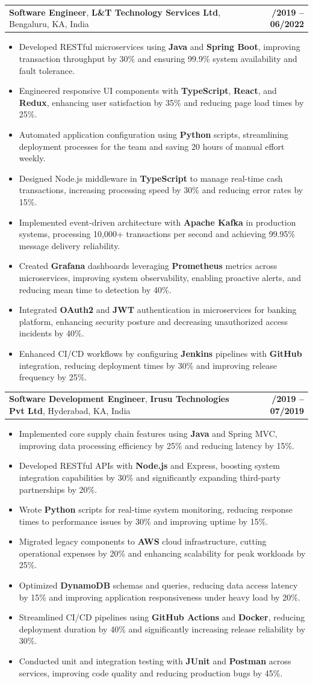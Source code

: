 \documentclass[letterpaper,11pt]{article}
\makeatletter
\newcommand{\resumeItem}[1]{
  \item\footnotesize{
    {#1 \vspace{-2pt}}
  }
}
\newcommand{\resumeSubheading}[4]{
  \vspace{-2pt}\item
    \begin{tabular*}{1.0\textwidth}[t]{l@{\extracolsep{\fill}}r}
      \textbf{\fontsize{10pt}{14pt}\selectfont #3}, \textbf{\fontsize{10pt}{14pt}\selectfont #1}, \fontsize{10pt}{14pt}\selectfont #4 & \textbf{\fontsize{10pt}{14pt}\selectfont #2} \\
    \end{tabular*}\vspace{-7pt}
}
\newcommand{\resumeItemListStart}{\begin{itemize}[leftmargin=*]}
\newcommand{\resumeItemListEnd}{\end{itemize}\vspace{-5pt}}
\makeatother
\begin{document}
    \resumeSubheading
        {L\&T Technology Services Ltd}{08/2019 -- 06/2022}
        {Software Engineer}{Bengaluru, KA, India}
      \resumeItemListStart
        \resumeItem{Developed RESTful microservices using \textbf{Java} and \textbf{Spring Boot}, improving transaction throughput by 30\% and ensuring 99.9\% system availability and fault tolerance.}
        \resumeItem{Engineered responsive UI components with \textbf{TypeScript}, \textbf{React}, and \textbf{Redux}, enhancing user satisfaction by 35\% and reducing page load times by 25\%.}
        \resumeItem{Automated application configuration using \textbf{Python} scripts, streamlining deployment processes for the team and saving 20 hours of manual effort weekly.}
        \resumeItem{Designed Node.js middleware in \textbf{TypeScript} to manage real-time cash transactions, increasing processing speed by 30\% and reducing error rates by 15\%.}
        \resumeItem{Implemented event-driven architecture with \textbf{Apache Kafka} in production systems, processing 10,000+ transactions per second and achieving 99.95\% message delivery reliability.}
        \resumeItem{Created \textbf{Grafana} dashboards leveraging \textbf{Prometheus} metrics across microservices, improving system observability, enabling proactive alerts, and reducing mean time to detection by 40\%.}
        \resumeItem{Integrated \textbf{OAuth2} and \textbf{JWT} authentication in microservices for banking platform, enhancing security posture and decreasing unauthorized access incidents by 40\%.}
        \resumeItem{Enhanced CI/CD workflows by configuring \textbf{Jenkins} pipelines with \textbf{GitHub} integration, reducing deployment times by 30\% and improving release frequency by 25\%.}
      \resumeItemListEnd

    \resumeSubheading
        {Irusu Technologies Pvt Ltd}{01/2019 -- 07/2019}
        {Software Development Engineer}{Hyderabad, KA, India}
      \resumeItemListStart
        \resumeItem{Implemented core supply chain features using \textbf{Java} and Spring MVC, improving data processing efficiency by 25\% and reducing latency by 15\%.}
        \resumeItem{Developed RESTful APIs with \textbf{Node.js} and Express, boosting system integration capabilities by 30\% and significantly expanding third-party partnerships by 20\%.}
        \resumeItem{Wrote \textbf{Python} scripts for real-time system monitoring, reducing response times to performance issues by 30\% and improving uptime by 15\%.}
        \resumeItem{Migrated legacy components to \textbf{AWS} cloud infrastructure, cutting operational expenses by 20\% and enhancing scalability for peak workloads by 25\%.}
        \resumeItem{Optimized \textbf{DynamoDB} schemas and queries, reducing data access latency by 15\% and improving application responsiveness under heavy load by 20\%.}
        \resumeItem{Streamlined CI/CD pipelines using \textbf{GitHub Actions} and \textbf{Docker}, reducing deployment duration by 40\% and significantly increasing release reliability by 30\%.}
        \resumeItem{Conducted unit and integration testing with \textbf{JUnit} and \textbf{Postman} across services, improving code quality and reducing production bugs by 45\%.}
      \resumeItemListEnd
\end{document}
